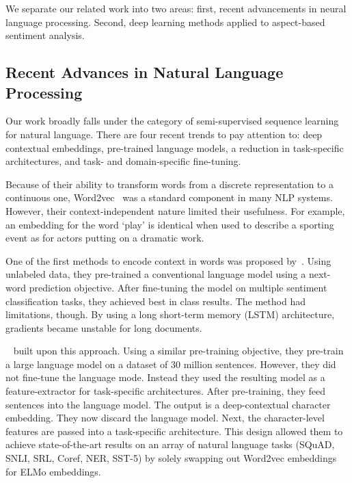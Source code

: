 We separate our related work into two areas: first, recent advancements in neural language processing.
Second, deep learning methods applied to aspect-based sentiment analysis.

\subsection{Recent Advances in Natural Language Processing}\label{subsec:recent-advances-in-natural-language-processing}

Our work broadly falls under the category of semi-supervised sequence learning for natural language.
There are four recent trends to pay attention to: deep contextual embeddings, pre-trained language models, a reduction in task-specific architectures, and task- and domain-specific fine-tuning.

Because of their ability to transform words from a discrete representation to a continuous one, Word2vec~\citep{mikolov2013efficient} was a standard component in many NLP systems.
However, their context-independent nature limited their usefulness.
For example, an embedding for the word ‘play’ is identical when used to describe a sporting event as for actors putting on a dramatic work.

One of the first methods to encode context in words was proposed by~\cite{dai2015semisupervised}.
Using unlabeled data, they pre-trained a conventional language model using a next-word prediction objective.
After fine-tuning the model on multiple sentiment classification tasks, they achieved best in class results.
The method had limitations, though.
By using a long short-term memory (LSTM) architecture, gradients became unstable for long documents.

~\cite{peters2018deep} built upon this approach.
Using a similar pre-training objective, they pre-train a large language model on a dataset of 30 million sentences.
However, they did not fine-tune the language mode.
Instead they used the resulting model as a feature-extractor for task-specific architectures.
After pre-training, they feed sentences into the language model.
The output is a deep-contextual character embedding.
They now discard the language model.
Next, the character-level features are passed into a task-specific architecture.
This design allowed them to achieve state-of-the-art results on an array of natural language tasks (SQuAD, SNLI, SRL, Coref, NER, SST-5) by solely swapping out Word2vec embeddings for ELMo embeddings.

